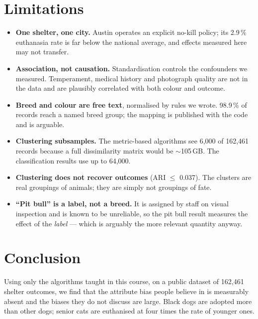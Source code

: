 \documentclass[11pt,a4paper]{article}
\begin{document}
\section{Limitations}

\begin{itemize}
  \item \textbf{One shelter, one city.} Austin operates an explicit no-kill
        policy; its 2.9\,\% euthanasia rate is far below the national average,
        and effects measured here may not transfer.
  \item \textbf{Association, not causation.} Standardisation controls the
        confounders we measured. Temperament, medical history and photograph
        quality are not in the data and are plausibly correlated with both
        colour and outcome.
  \item \textbf{Breed and colour are free text}, normalised by rules we wrote.
        98.9\,\% of records reach a named breed group; the mapping is published
        with the code and is arguable.
  \item \textbf{Clustering subsamples.} The metric-based algorithms see 6{,}000
        of 162{,}461 records because a full dissimilarity matrix would be
        $\sim$105\,GB. The classification results use up to 64{,}000.
  \item \textbf{Clustering does not recover outcomes} (ARI $\le$ 0.037). The
        clusters are real groupings of animals; they are simply not groupings of
        fate.
  \item \textbf{``Pit bull'' is a label, not a breed.} It is assigned by staff on
        visual inspection and is known to be unreliable, so the pit bull result
        measures the effect of the \emph{label} --- which is arguably the more
        relevant quantity anyway.
\end{itemize}

\section{Conclusion}

Using only the algorithms taught in this course, on a public dataset of 162{,}461
shelter outcomes, we find that the attribute bias people believe in is
measurably absent and the biases they do not discuss are large. Black dogs are
adopted more than other dogs; senior cats are euthanised at four times the rate
of younger ones.
\end{document}

